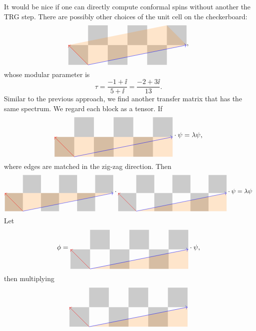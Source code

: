 \documentclass{article}
\begin{document}
It would be nice if one can directly compute conformal spins without another the TRG step.
There are possibly other choices of the unit cell on the checkerboard:
\[
\diagram{1}{
\foreach \i in {0, 1, 2}
{
    \foreach \j in {0}
    {
        \fill[opacity = .2] (2*\i, 2*\j) rectangle (2*\i+1, 2*\j+1);
        \fill[opacity = .2] (2*\i+1, 2*\j+1) rectangle (2*\i+2, 2*\j+2);
    }
}
\fill[orange, opacity = .2] (1,0) -- (0,1) -- (5,2) -- (6, 1) -- cycle;
\draw[->, red] (1,0) -- (0,1);
\draw[->, blue] (1,0) -- (6,1);
},
\]
whose modular parameter is
\[
\tau = \frac{-1+\ii}{5+\ii} = \frac{-2+3 \ii}{13}.
\]
Similar to the previous approach, we find another transfer matrix that has the same spectrum. We regard each block as a tensor.
If
\[
\diagram{1}{
\foreach \i in {0, 1, 2}
{
    \foreach \j in {0}
    {
        \fill[opacity = .2] (2*\i, 2*\j) rectangle (2*\i+1, 2*\j+1);
        \fill[opacity = .2] (2*\i+1, 2*\j+1) rectangle (2*\i+2, 2*\j+2);
    }
}
\fill[orange, opacity = .2] (0,0) rectangle (6,1);
\draw[->, red] (1,0) -- (0,1);
\draw[->, blue] (1,0) -- (6,1);
} \cdot \psi = \lambda \psi,
\]
where edges are matched in the zig-zag direction. Then
\[
\diagram{1}{
\foreach \i in {0, 1, 2}
{
    \foreach \j in {0}
    {
        \fill[opacity = .2] (2*\i, 2*\j) rectangle (2*\i+1, 2*\j+1);
        \fill[opacity = .2] (2*\i+1, 2*\j+1) rectangle (2*\i+2, 2*\j+2);
    }
}
\fill[orange, opacity = .2] (0,0) -- (1,0) -- (6,1) -- (0,1) -- cycle;
\draw[->, red] (1,0) -- (0,1);
\draw[->, blue] (1,0) -- (6,1);
} \cdot \diagram{1}{
\foreach \i in {0, 1, 2}
{
    \foreach \j in {0}
    {
        \fill[opacity = .2] (2*\i, 2*\j) rectangle (2*\i+1, 2*\j+1);
        \fill[opacity = .2] (2*\i+1, 2*\j+1) rectangle (2*\i+2, 2*\j+2);
    }
}
\fill[orange, opacity = .2] (1,0) -- (6,0) -- (6,1) -- cycle;
\draw[->, red] (1,0) -- (0,1);
\draw[->, blue] (1,0) -- (6,1);
}\cdot \psi = \lambda \psi
\]
Let
\[
\phi = \diagram{1}{
\foreach \i in {0, 1, 2}
{
    \foreach \j in {0}
    {
        \fill[opacity = .2] (2*\i, 2*\j) rectangle (2*\i+1, 2*\j+1);
        \fill[opacity = .2] (2*\i+1, 2*\j+1) rectangle (2*\i+2, 2*\j+2);
    }
}
\fill[orange, opacity = .2] (1,0) -- (6,0) -- (6,1) -- cycle;
\draw[->, red] (1,0) -- (0,1);
\draw[->, blue] (1,0) -- (6,1);
}\cdot \psi,
\]
then multiplying 
\[
\diagram{1}{
\foreach \i in {0, 1, 2}
{
    \foreach \j in {0}
    {
        \fill[opacity = .2] (2*\i, 2*\j) rectangle (2*\i+1, 2*\j+1);
        \fill[opacity = .2] (2*\i+1, 2*\j+1) rectangle (2*\i+2, 2*\j+2);
    }
}
\fill[orange, opacity = .2] (1,0) -- (6,0) -- (6,1) -- cycle;
\draw[->, red] (1,0) -- (0,1);
\draw[->, blue] (1,0) -- (6,1);
}
\]
\end{document}
